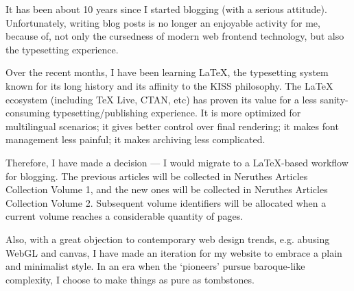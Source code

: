 
It has been about 10 years since I started blogging (with a serious attitude).
Unfortunately, writing blog posts is no longer an enjoyable activity for me,
because of, not only the cursedness of modern web frontend technology,
but also the typesetting experience.

Over the recent months, I have been learning \LaTeX{},
the typesetting system known for its long history and its affinity to the KISS philosophy.
The \LaTeX{} ecosystem (including \TeX{} Live, CTAN, etc)
has proven its value for a less sanity-consuming typesetting/publishing experience.
It is more optimized for multilingual scenarios; it gives better control over final rendering;
it makes font management less painful; it makes archiving less complicated.

Therefore, I have made a decision ---
I would migrate to a \LaTeX{}-based workflow for blogging.
The previous articles will be collected in Neruthes Articles Collection Volume 1,
and the new ones will be collected in Neruthes Articles Collection Volume 2.
Subsequent volume identifiers will be allocated when a current volume reaches a considerable quantity of pages.

Also, with a great objection to contemporary web design trends,
e.g. abusing WebGL and canvas,
I have made an iteration for my website to embrace a plain and minimalist style.
In an era when the `pioneers' pursue baroque-like complexity,
I choose to make things as pure as tombstones.
